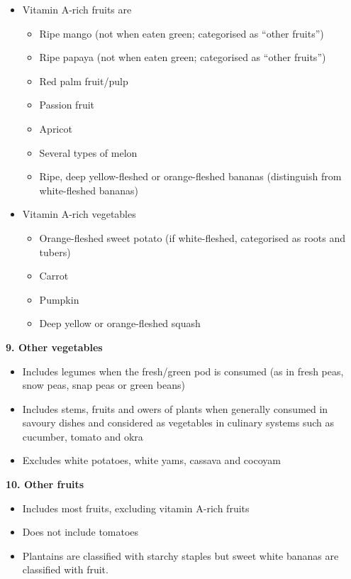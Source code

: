 \documentclass[12pt,]{book}
\providecommand{\tightlist}{%
  \setlength{\itemsep}{0pt}\setlength{\parskip}{0pt}}
\theoremstyle{definition}
\theoremstyle{definition}
\theoremstyle{definition}
\theoremstyle{remark}
\begin{document}
\begin{itemize}
\tightlist
\item
  Vitamin A-rich fruits are

  \begin{itemize}
  \tightlist
  \item
    Ripe mango (not when eaten green; categorised as ``other fruits'')
  \item
    Ripe papaya (not when eaten green; categorised as ``other fruits'')
  \item
    Red palm fruit/pulp
  \item
    Passion fruit
  \item
    Apricot
  \item
    Several types of melon
  \item
    Ripe, deep yellow-fleshed or orange-fleshed bananas (distinguish
    from white-fleshed bananas)
  \end{itemize}
\item
  Vitamin A-rich vegetables

  \begin{itemize}
  \tightlist
  \item
    Orange-fleshed sweet potato (if white-fleshed, categorised as roots
    and tubers)
  \item
    Carrot
  \item
    Pumpkin
  \item
    Deep yellow or orange-fleshed squash
  \end{itemize}
\end{itemize}

\textbf{9. Other vegetables}

\begin{itemize}
\tightlist
\item
  Includes legumes when the fresh/green pod is consumed (as in fresh
  peas, snow peas, snap peas or green beans)
\item
  Includes stems, fruits and owers of plants when generally consumed in
  savoury dishes and considered as vegetables in culinary systems such
  as cucumber, tomato and okra
\item
  Excludes white potatoes, white yams, cassava and cocoyam
\end{itemize}

\textbf{10. Other fruits}

\begin{itemize}
\tightlist
\item
  Includes most fruits, excluding vitamin A-rich fruits
\item
  Does not include tomatoes
\item
  Plantains are classified with starchy staples but sweet white bananas
  are classified with fruit.
\end{itemize}
\end{document}
